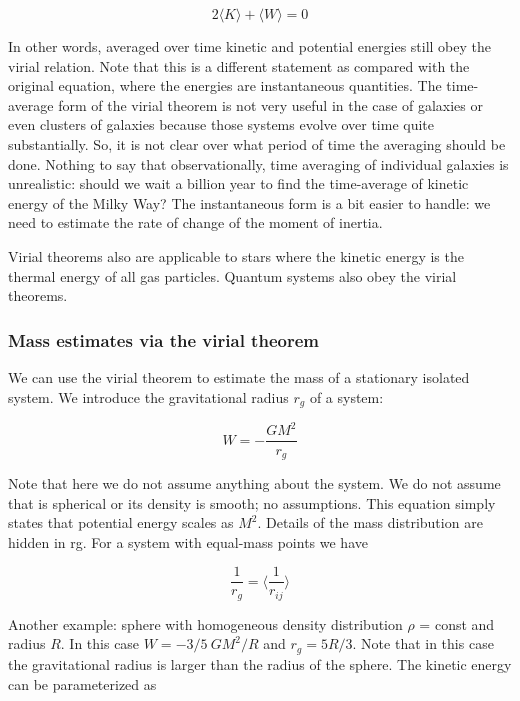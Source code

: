 \begin{equation}
2\langle K\rangle + \langle W\rangle = 0
\end{equation}

In other words, averaged over time kinetic and potential energies still obey the virial relation. Note that this is a different statement as compared with the original equation, where the energies are instantaneous quantities. The time-average form of the virial theorem is not very useful in the case of galaxies or even clusters of galaxies because those systems evolve over time quite substantially. So, it is not clear over what period of time the averaging should be done. Nothing to say that observationally, time averaging of individual galaxies is unrealistic: should we wait a billion year to find the time-average of kinetic energy of the Milky Way? The instantaneous form is a bit easier to handle: we need to estimate the rate of change of the moment of inertia.

Virial theorems also are applicable to stars where the kinetic energy is the thermal energy of all gas particles. Quantum systems also obey the virial theorems.

\subsubsection{Mass estimates via the virial theorem}

We can use the virial theorem to estimate the mass of a stationary isolated system. We introduce the gravitational radius $r_g$ of a system:

\begin{equation}
W = -\frac{GM^2}{r_g}
\end{equation}

Note that here we do not assume anything about the system. We do not assume that is spherical or its density is smooth; no assumptions. This equation simply states that potential energy scales as $M^2$. Details of the mass distribution are hidden in rg. For a system with equal-mass points we have
 
\begin{equation}
\frac{1}{r_g} = \langle \frac{1}{r_{ij}}\rangle 
\end{equation}


Another example: sphere with homogeneous density distribution $\rho $ = const and radius $R$. In this case $W = -3/5 \ GM^2/R$ and $r_g = 5R/3$. Note that in this case the gravitational radius is larger than the radius of the sphere. The kinetic energy can be parameterized as


